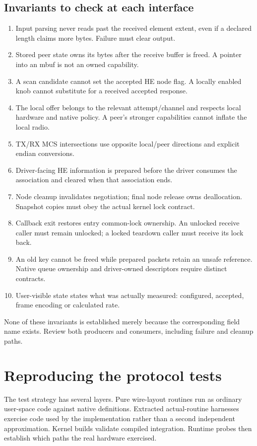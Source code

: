 \documentclass[11pt,letterpaper,oneside]{article}
\begin{document}
\subsection{Invariants to check at each interface}
\begin{enumerate}
\item Input parsing never reads past the received element extent, even if a declared length claims more bytes. Failure must clear output.
\item Stored peer state owns its bytes after the receive buffer is freed. A pointer into an mbuf is not an owned capability.
\item A scan candidate cannot set the accepted HE node flag. A locally enabled knob cannot substitute for a received accepted response.
\item The local offer belongs to the relevant attempt/channel and respects local hardware and native policy. A peer's stronger capabilities cannot inflate the local radio.
\item TX/RX MCS intersections use opposite local/peer directions and explicit endian conversions.
\item Driver-facing HE information is prepared before the driver consumes the association and cleared when that association ends.
\item Node cleanup invalidates negotiation; final node release owns deallocation. Snapshot copies must obey the actual kernel lock contract.
\item Callback exit restores entry common-lock ownership. An unlocked receive caller must remain unlocked; a locked teardown caller must receive its lock back.
\item An old key cannot be freed while prepared packets retain an unsafe reference. Native queue ownership and driver-owned descriptors require distinct contracts.
\item User-visible state states what was actually measured: configured, accepted, frame encoding or calculated rate.
\end{enumerate}
None of these invariants is established merely because the corresponding field name exists. Review both producers and consumers, including failure and cleanup paths.

\section{Reproducing the protocol tests}
The test strategy has several layers. Pure wire-layout routines run as ordinary user-space code against native definitions. Extracted actual-routine harnesses exercise code used by the implementation rather than a second independent approximation. Kernel builds validate compiled integration. Runtime probes then establish which paths the real hardware exercised.
\end{document}
